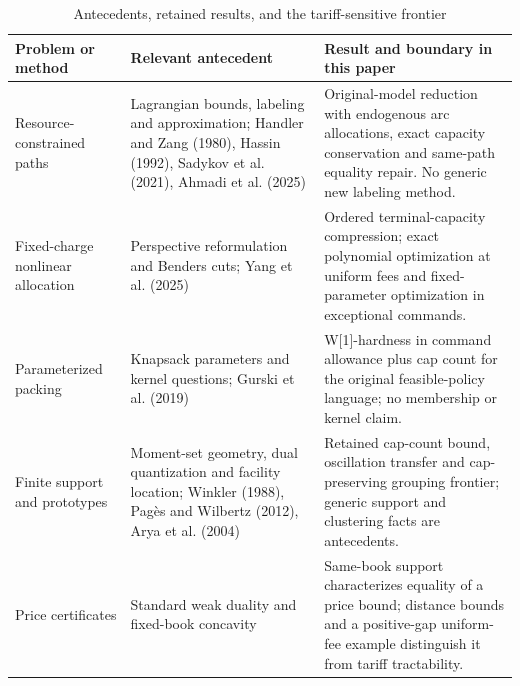 \documentclass[11pt,letterpaper]{article}
\theoremstyle{definition}\newtheorem{remark}[theorem]{Remark}
\begin{document}
\begin{table}[p]\centering
\caption{Antecedents, retained results, and the tariff-sensitive frontier}\label{tab:frontier60}
\begin{tabular}{p{}p{}p{}}\toprule
Problem or method & Relevant antecedent & Result and boundary in this paper\\\midrule
Resource-constrained paths & Lagrangian bounds, labeling and approximation; Handler and Zang (1980), Hassin (1992), Sadykov et al. (2021), Ahmadi et al. (2025) & Original-model reduction with endogenous arc allocations, exact capacity conservation and same-path equality repair. No generic new labeling method.\\[0.07in]
Fixed-charge nonlinear allocation & Perspective reformulation and Benders cuts; Yang et al. (2025) & Ordered terminal-capacity compression; exact polynomial optimization at uniform fees and fixed-parameter optimization in exceptional commands.\\[0.07in]
Parameterized packing & Knapsack parameters and kernel questions; Gurski et al. (2019) & W[1]-hardness in command allowance plus cap count for the original feasible-policy language; no membership or kernel claim.\\[0.07in]
Finite support and prototypes & Moment-set geometry, dual quantization and facility location; Winkler (1988), Pag\`es and Wilbertz (2012), Arya et al. (2004) & Retained cap-count bound, oscillation transfer and cap-preserving grouping frontier; generic support and clustering facts are antecedents.\\[0.07in]
Price certificates & Standard weak duality and fixed-book concavity & Same-book support characterizes equality of a price bound; distance bounds and a positive-gap uniform-fee example distinguish it from tariff tractability.\\\bottomrule
\end{tabular}
\end{table}
\end{document}
